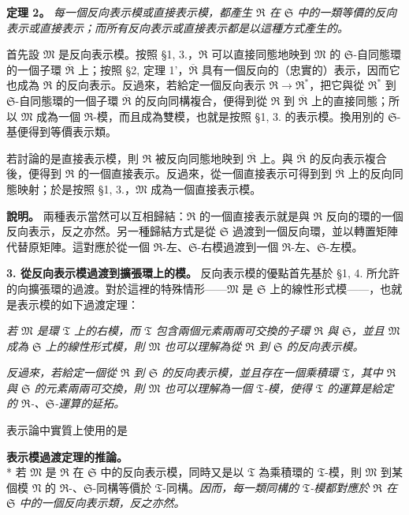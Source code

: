 \documentclass[11pt]{article}
\providecommand{\frR}{\mathfrak R}
\providecommand{\frS}{\mathfrak S}
\providecommand{\frT}{\mathfrak T}
\providecommand{\frM}{\mathfrak M}
\providecommand{\frN}{\mathfrak N}
\begin{document}
\noindent\textbf{定理 2。} \emph{每一個反向表示模或直接表示模，都產生 \(\frR\) 在 \(\frS\) 中的一類等價的反向表示或直接表示；而所有反向表示或直接表示都是以這種方式產生的。}

首先設 \(\frM\) 是反向表示模。按照 §1, 3.，\(\frR\) 可以直接同態地映到 \(\frM\) 的 \(\frS\)-自同態環的一個子環 \(\overline{\frR}\) 上；按照 §2, 定理 1'，\(\overline{\frR}\) 具有一個反向的（忠實的）表示，因而它也成為 \(\frR\) 的反向表示。反過來，若給定一個反向表示 \(\frR\to\frR^*\)，把它與從 \(\frR^*\) 到 \(\frS\)-自同態環的一個子環 \(\overline{\frR}\) 的反向同構複合，便得到從 \(\frR\) 到 \(\overline{\frR}\) 上的直接同態；所以 \(\frM\) 成為一個 \(\frR\)-模，而且成為雙模，也就是按照 §1, 3. 的表示模。換用別的 \(\frS\)-基便得到等價表示類。

若討論的是直接表示模，則 \(\frR\) 被反向同態地映到 \(\overline{\frR}\) 上。與 \(\overline{\frR}\) 的反向表示複合後，便得到 \(\frR\) 的一個直接表示。反過來，從一個直接表示可得到到 \(\overline{\frR}\) 上的反向同態映射；於是按照 §1, 3.，\(\frM\) 成為一個直接表示模。

\noindent\textbf{說明。} 兩種表示當然可以互相歸結：\(\frR\) 的一個直接表示就是與 \(\frR\) 反向的環的一個反向表示，反之亦然。另一種歸結方式是從 \(\frS\) 過渡到一個反向環，並以轉置矩陣代替原矩陣。這對應於從一個 \(\frR\)-左、\(\frS\)-右模過渡到一個 \(\frR\)-左、\(\frS\)-左模。

\noindent\textbf{3. 從反向表示模過渡到擴張環上的模。} 反向表示模的優點首先基於 §1, 4. 所允許的向擴張環的過渡。對於這裡的特殊情形——\(\frM\) 是 \(\frS\) 上的線性形式模——，也就是表示模的如下過渡定理：

\emph{若 \(\frM\) 是環 \(\frT\) 上的右模，而 \(\frT\) 包含兩個元素兩兩可交換的子環 \(\frR\) 與 \(\frS\)，並且 \(\frM\) 成為 \(\frS\) 上的線性形式模，則 \(\frM\) 也可以理解為從 \(\frR\) 到 \(\frS\) 的反向表示模。}

\emph{反過來，若給定一個從 \(\frR\) 到 \(\frS\) 的反向表示模，並且存在一個乘積環 \(\frT\)，其中 \(\frR\) 與 \(\frS\) 的元素兩兩可交換，則 \(\frM\) 也可以理解為一個 \(\frT\)-模，使得 \(\frT\) 的運算是給定的 \(\frR\)-、\(\frS\)-運算的延拓。}

表示論中實質上使用的是

\noindent\textbf{表示模過渡定理的推論。}\\*
若 \(\frM\) 是 \(\frR\) 在 \(\frS\) 中的反向表示模，同時又是以 \(\frT\) 為乘積環的 \(\frT\)-模，則 \(\frM\) 到某個模 \(\frN\) 的 \(\frR\)-、\(\frS\)-同構等價於 \(\frT\)-同構。\emph{因而，每一類同構的 \(\frT\)-模都對應於 \(\frR\) 在 \(\frS\) 中的一個反向表示類，反之亦然。}
\end{document}

